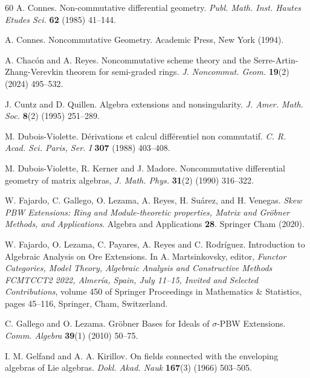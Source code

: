 \documentclass{amsart}
\theoremstyle{definition}
\theoremstyle{remark}
\numberwithin{equation}{section}
\begin{document}
\begin{thebibliography}{60}
 A. Connes. Non-commutative differential geometry. {\em Publ. Math. Inst. Hautes Etudes Sci.} {\bf 62} (1985) 41--144.

 A. Connes. Noncommutative Geometry. Academic Press, New York (1994).

 A. Chac\'on and A. Reyes. Noncommutative scheme theory and the Serre-Artin-Zhang-Verevkin theorem for semi-graded rings. {\em J. Noncommut. Geom.} {\bf 19}(2) (2024) 495--532.

 J. Cuntz and D. Quillen. Algebra extensions and nonsingularity. {\em J. Amer. Math. Soc.} {\bf 8}(2) (1995) 251--289.


 M. Dubois-Violette. D\'erivations et calcul diff\'erentiel non commutatif. {\em C. R. Acad. Sci. Paris, Ser. I} {\bf 307} (1988) 403--408.

 M. Dubois-Violette, R. Kerner and J. Madore. Noncommutative differential geometry of matrix algebras, {\em J. Math. Phys.} {\bf 31}(2) (1990) 316--322.

 W. Fajardo, C. Gallego, O.  Lezama, A. Reyes, H. Su\'arez, and H. Venegas. {\em Skew PBW Extensions: Ring and Module-theoretic properties, Matrix and Gr\"obner Methods, and Applications}. Algebra and Applications {\bf 28}. Springer Cham (2020).

 W. Fajardo, O. Lezama, C. Payares, A. Reyes and C. Rodr\'iguez. Introduction to Algebraic Analysis on Ore Extensions. In A. Martsinkovsky, editor, {\em Functor Categories, Model Theory, Algebraic Analysis and Constructive Methods FCMTCCT2 2022, Almer\'ia, Spain, July 11--15, Invited and Selected Contributions}, volume 450 of Springer Proceedings in Mathematics \& Statistics, pages 45--116, Springer, Cham, Switzerland.


 C. Gallego and O. Lezama. Gr{\"o}bner {B}ases for {I}deals of $\sigma$-{P}{B}{W} {E}xtensions. {\em Comm. Algebra} {\bf 39}(1) (2010) 50--75.

 I. M. Gelfand and A. A. Kirillov. On fields connected with the enveloping algebras of {L}ie algebras. {\em Dokl. Akad. Nauk} {\bf 167}(3) (1966) 503--505.


\end{thebibliography}
\end{document}
